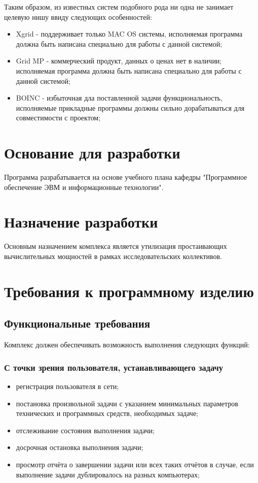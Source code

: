 \documentclass[a4paper,12pt]{report}
\numberwithin{equation}{section}
\begin{document}
Таким образом, из известных систем подобного рода ни одна не занимает целевую нишу ввиду следующих особенностей: 
\begin{itemize}
  \item Xgrid - поддерживает только MAC OS системы, исполняемая программа должна быть написана специально для работы с данной системой;
  \item Grid MP - коммерческий продукт, данных о ценах нет в наличии; исполняемая программа должна быть написана специально для работы с данной системой;
  \item BOINC - избыточная дла поставленной задачи функциональность, исполняемые прикладные программы должны сильно дорабатываться для совместимости с проектом;
\end{itemize}

\section{Основание для разработки}
Программа разрабатывается на основе учебного плана кафедры "Программное обеспечение ЭВМ и информационные технологии".

\section{Назначение разработки}
Основным назначением комплекса является утилизация простаивающих вычислительных мощностей в рамках исследовательских коллективов.

\section{Требования к программному изделию}
\subsection{Функциональные требования}
Комплекс должен обеспечивать возможность выполнения следующих функций:
\subsubsection{С точки зрения пользователя, устанавливающего задачу}
\begin{itemize}
  \item регистрация пользователя в сети;
  \item постановка произвольной задачи с указанием минимальных параметров технических и программных средств, необходимых задаче;
  \item отслеживание состояния выполнения задачи;
  \item досрочная остановка выполнения задачи;
  \item просмотр отчёта о завершении задачи или всех таких отчётов в случае, если выполнение задачи дублировалось на разных компьютерах;
\end{itemize}
\end{document}
